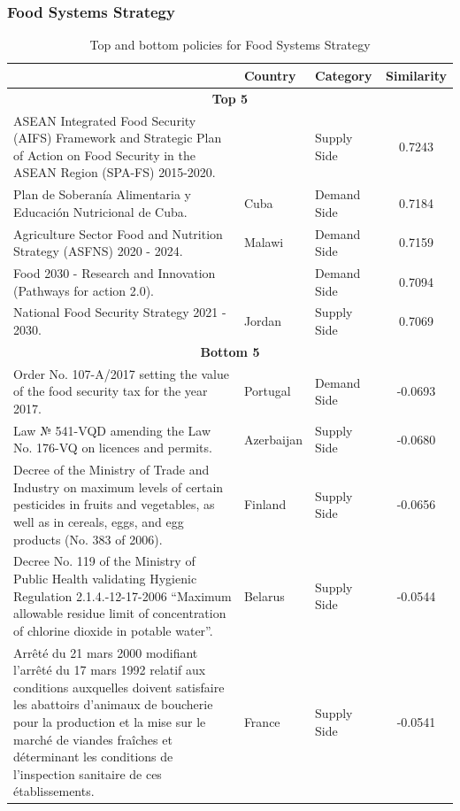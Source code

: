 \subsubsection{Food Systems Strategy}
\begin{table}[htbp]
\centering
\begin{tabular}{l l l c}
\toprule
 & Country & Category & Similarity \\
\midrule
\multicolumn{4}{c}{\textbf{Top 5}} \\
ASEAN Integrated Food Security (AIFS) Framework and Strategic Plan of Action on Food Security in the ASEAN Region (SPA-FS) 2015-2020. &  & Supply Side & 0.7243 \\
Plan de Soberanía Alimentaria y Educación Nutricional de Cuba. & Cuba & Demand Side & 0.7184 \\
Agriculture Sector Food and Nutrition Strategy (ASFNS) 2020 - 2024. & Malawi & Demand Side & 0.7159 \\
Food 2030 - Research and Innovation (Pathways for action 2.0). &  & Demand Side & 0.7094 \\
National Food Security Strategy 2021 - 2030. & Jordan & Supply Side & 0.7069 \\
\midrule
\multicolumn{4}{c}{\textbf{Bottom 5}} \\
Order No. 107-A/2017 setting the value of the food security tax for the year 2017. & Portugal & Demand Side & -0.0693 \\
Law № 541-VQD amending the Law No. 176-VQ on licences and permits. & Azerbaijan & Supply Side & -0.0680 \\
Decree of the Ministry of Trade and Industry on maximum levels of certain pesticides in fruits and vegetables, as well as in cereals, eggs, and egg products (No. 383 of 2006). & Finland & Supply Side & -0.0656 \\
Decree No. 119 of the Ministry of Public Health validating Hygienic Regulation 2.1.4.-12-17-2006 “Maximum allowable residue limit of concentration of chlorine dioxide in potable water”. & Belarus & Supply Side & -0.0544 \\
Arrêté du 21 mars 2000 modifiant l'arrêté du 17 mars 1992 relatif aux conditions auxquelles doivent satisfaire les abattoirs d'animaux de boucherie pour la production et la mise sur le marché de viandes fraîches et déterminant les conditions de l'inspection sanitaire de ces établissements. & France & Supply Side & -0.0541 \\
\bottomrule
\end{tabular}
\caption{Top and bottom policies for Food Systems Strategy}
\label{tab:top_bottom_fs}
\end{table}

